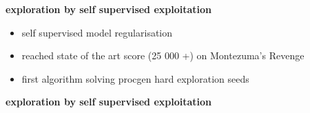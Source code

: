 \documentclass{beamer}
\begin{document}
\begin{frame}{\bf exploration by self supervised exploitation}


  \begin{itemize}
    \item self supervised model regularisation
    \item reached state of the art score (25 000 +) on Montezuma's Revenge
    \item first algorithm solving procgen hard exploration seeds
  \end{itemize} 
\end{frame}



\begin{frame}{\bf exploration by self supervised exploitation}


\end{frame}
\end{document}
